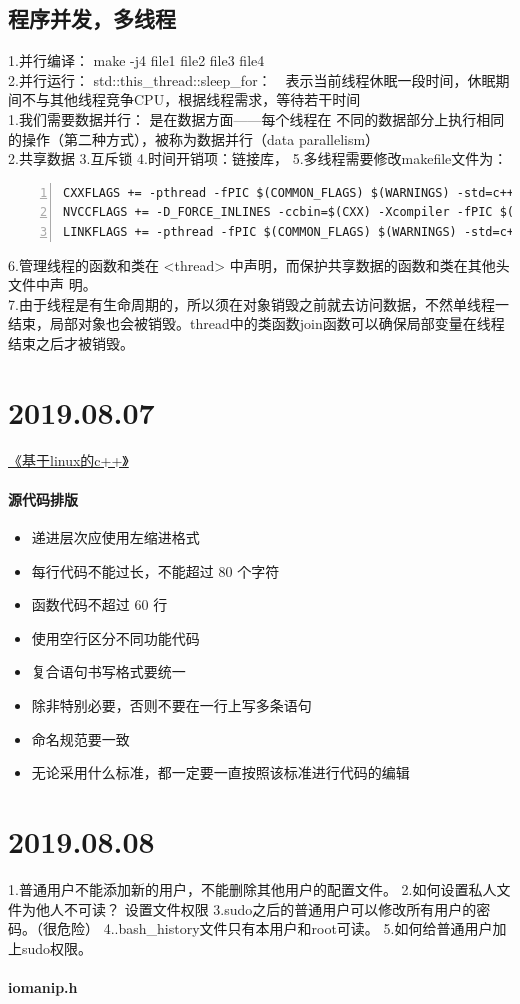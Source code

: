 \documentclass[UTF8,a4paper]{ctexart}
\begin{document}
\subsection{程序并发，多线程}
1.并行编译： make -j4 file1 file2 file3 file4\\
2.并行运行： 
std::this_thread::sleep_for：　表示当前线程休眠一段时间，休眠期间不与其他线程竞争CPU，根据线程需求，等待若干时间\\
1.我们需要数据并行： 是在数据方面——每个线程在
不同的数据部分上执行相同的操作（第二种方式），被称为数据并行（data
parallelism）\\
2.共享数据
3.互斥锁
4.时间开销项：链接库，
5.多线程需要修改makefile文件为：\\
 \begin{lstlisting}[language={[ANSI]C},numbers=left,numberstyle=\tiny]  
CXXFLAGS += -pthread -fPIC $(COMMON_FLAGS) $(WARNINGS) -std=c++11
NVCCFLAGS += -D_FORCE_INLINES -ccbin=$(CXX) -Xcompiler -fPIC $(COMMON_FLAGS) -std=c++11
LINKFLAGS += -pthread -fPIC $(COMMON_FLAGS) $(WARNINGS) -std=c++11
   \end{lstlisting}
   6.管理线程的函数和类在 <thread> 中声明，而保护共享数据的函数和类在其他头文件中声
明。\\
7.由于线程是有生命周期的，所以须在对象销毁之前就去访问数据，不然单线程一结束，局部对象也会被销毁。thread中的类函数join函数可以确保局部变量在线程结束之后才被销毁。\\
\section{2019.08.07}
\href{http://www.xuetangx.com/courses/course-v1:TsinghuaX+20740084X+2019_T1/about}{《基于linux的c++》}
\paragraph{源代码排版}
\begin{itemize}
\item 递进层次应使用左缩进格式
\item 每行代码不能过长，不能超过 $80$ 个字符
\item 函数代码不超过 $60$ 行
\item 使用空行区分不同功能代码
\item 复合语句书写格式要统一
\item 除非特别必要，否则不要在一行上写多条语句
\item 命名规范要一致
\item 无论采用什么标准，都一定要一直按照该标准进行代码的编辑
\end{itemize}
\section{2019.08.08}
1.普通用户不能添加新的用户，不能删除其他用户的配置文件。
2.如何设置私人文件为他人不可读？  设置文件权限
3.sudo之后的普通用户可以修改所有用户的密码。（很危险）
4..bash_history文件只有本用户和root可读。
5.如何给普通用户加上sudo权限。
\paragraph{iomanip.h}
\end{document}

